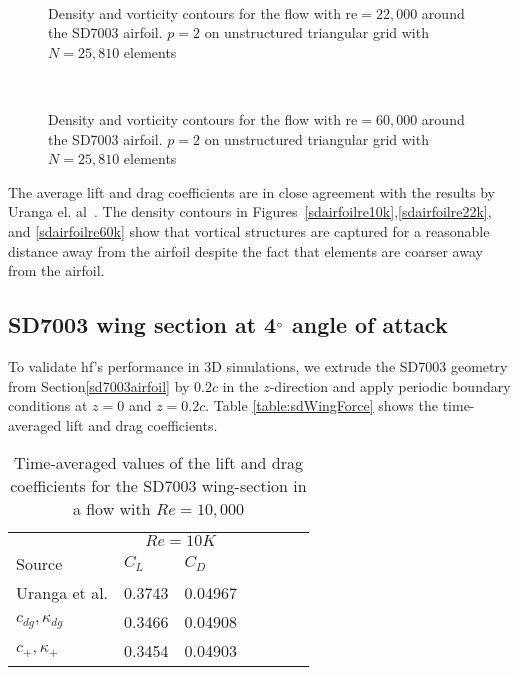 \begin{figure}[htbp]
\centering
{}
\\

\caption{Density and vorticity contours for the flow with \gls{re}$= 22,000$ around the SD7003 airfoil. $p=2$ on unstructured triangular grid with $N = 25,810$ elements}
\label{sdairfoilre22k}
\end{figure}

\begin{figure}[htbp]
\centering
{}
\\

\caption{Density and vorticity contours for the flow with \gls{re}$= 60,000$ around the SD7003 airfoil. $p=2$ on unstructured triangular grid with $N = 25,810$ elements}
\label{sdairfoilre60k}
\end{figure}

The average lift and drag coefficients are in close agreement with the results by Uranga el. al~\cite{uranga2011implicit}. The density contours in Figures~\eqref{sdairfoilre10k},\eqref{sdairfoilre22k}, and \eqref{sdairfoilre60k} show that vortical structures are captured for a reasonable distance away from the airfoil despite the fact that elements are coarser away from the airfoil.


\newpage

\subsection{SD7003 wing section at 4$^{\circ}$ angle of attack}
To validate \gls{hf}'s performance in 3D simulations, we extrude the SD7003 geometry from Section\eqref{sd7003airfoil} by $0.2c$ in the $z$-direction and apply periodic boundary conditions at $z=0$ and $z=0.2c$. Table \eqref{table:sdWingForce} shows the time-averaged lift and drag coefficients.


\begin{table}[htbp]
\centering
\begin{tabular}{ l| l l| l l| l l} 
  
 &  \multicolumn{2}{|c|}{$Re = 10K$}  \\ 
 Source & $C_L$ & $C_D$    \\ 
\hline
 Uranga et al.\cite{uranga2011implicit} & 0.3743 & 0.04967   \\ 
$c_{dg},\kappa_{dg}$ & 0.3466 & 0.04908  \\ 
$c_{+},\kappa_{+}$ & 0.3454 & 0.04903 \\ 
 \end{tabular}
\caption{Time-averaged values of the lift and drag coefficients for the SD7003 wing-section in a flow with $Re = 10,000$}
\label{table:sdWingForce} 
 \end{table}


